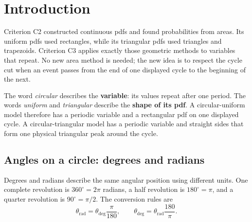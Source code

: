 	\section{Introduction}\label{sec:c3-introduction}
	\vspace{8mm}
	
	Criterion C2 constructed continuous pdfs and found probabilities from areas.
	Its uniform pdfs used rectangles, while its triangular pdfs used triangles and
	trapezoids.  Criterion C3 applies exactly those geometric methods to variables
	that repeat.  No new area method is needed; the new idea is to respect the
	cycle cut when an event passes from the end of one displayed cycle to the
	beginning of the next.
	
	The word \emph{circular} describes the \textbf{variable}: its values repeat
	after one period.  The words \emph{uniform} and \emph{triangular} describe the
	\textbf{shape of its pdf}.  A circular-uniform model therefore has a periodic
	variable and a rectangular pdf on one displayed cycle.  A
	circular-triangular model has a periodic variable and straight sides that form
	one physical triangular peak around the cycle.
	
	\subsection{Angles on a circle: degrees and radians}%
	\label{sec:c3-intro-angle-reference}
	Degrees and radians describe the same angular position using different units.
	One complete revolution is $360^\circ=2\pi$ radians, a half revolution is
	$180^\circ=\pi$, and a quarter revolution is $90^\circ=\pi/2$.  The
	conversion rules are
	\[
	\theta_{\mathrm{rad}}=\theta_{\mathrm{deg}}\frac{\pi}{180},
	\qquad
	\theta_{\mathrm{deg}}=\theta_{\mathrm{rad}}\frac{180}{\pi}.
	\]

